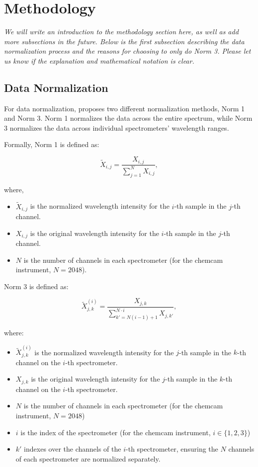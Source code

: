 \section{Methodology}\label{sec:methodology}
\textit{We will write an introduction to the methodology section here, as well as add more subsections in the future. Below is the first subsection describing the data normalization process and the reasons for choosing to only do Norm 3. Please let us know if the explanation and mathematical notation is clear.}

\subsection{Data Normalization}
For data normalization, \citet{cleggRecalibrationMarsScience2017} proposes two different normalization methods, Norm 1 and Norm 3.
Norm 1 normalizes the data across the entire spectrum, while Norm 3 normalizes the data across individual spectrometers' wavelength ranges.

Formally, Norm 1 is defined as:

\begin{equation}
	\tilde{X}_{i,j} = \frac{X_{i,j}}{\sum_{j=1}^{N} X_{i,j}},
\end{equation}

where,

\begin{itemize}
	\item $\tilde{X}_{i,j}$ is the normalized wavelength intensity for the $i$-th sample in the $j$-th channel.
	\item $X_{i,j}$ is the original wavelength intensity for the $i$-th sample in the $j$-th channel.
	\item $N$ is the number of channels in each spectrometer (for the \gls{chemcam} instrument, $N = 2048$).
\end{itemize}

Norm 3 is defined as:

\begin{equation}
	\tilde{X}_{j,k}^{(i)} = \frac{X_{j,k}}{\sum_{k'=N(i-1)+1}^{N \cdot i} X_{j,k'}},
\end{equation}

where:

\begin{itemize}
	\item $\tilde{X}_{j,k}^{(i)}$ is the normalized wavelength intensity for the $j$-th sample in the $k$-th channel on the $i$-th spectrometer.
	\item $X_{j,k}$ is the original wavelength intensity for the $j$-th sample in the $k$-th channel on the $i$-th spectrometer.
	\item $N$ is the number of channels in each spectrometer (for the \gls{chemcam} instrument, $N = 2048$)
	\item $i$ is the index of the spectrometer (for the \gls{chemcam} instrument, $i \in \{1, 2, 3\}$)
	\item $k'$ indexes over the channels of the $i$-th spectrometer, ensuring the $N$ channels of each spectrometer are normalized separately.
\end{itemize}


